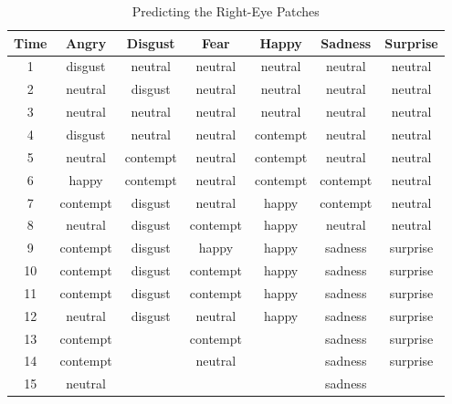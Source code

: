 \begin{table}
\caption{Predicting the Right-Eye Patches}
\label{table:predict_righteye}

\begin{tabular}{| c | c | c | c | c | c | c |}
\hline
Time & Angry &  Disgust  & Fear & Happy & Sadness & Surprise  \\
\hline
1 & disgust & neutral & neutral & neutral & neutral & neutral \\
2 & neutral & disgust & neutral & neutral & neutral & neutral \\
3 & neutral & neutral & neutral & neutral & neutral & neutral \\
4 & disgust & neutral & neutral & contempt & neutral & neutral \\
5 & neutral & contempt & neutral & contempt & neutral & neutral	\\
6 & happy & contempt & neutral & contempt & contempt & neutral \\
7 & contempt & disgust & neutral & happy & contempt & neutral \\
8 & neutral & disgust & contempt & happy & neutral & neutral \\
9 & contempt & disgust & happy & happy & sadness & surprise \\
10 & contempt & disgust & contempt & happy & sadness & surprise	\\
11 & contempt & disgust & contempt & happy & sadness & surprise \\
12 & neutral & disgust & neutral & happy & sadness & surprise \\
13 & contempt &  & contempt &  & sadness & surprise \\
14 & contempt &  & neutral &  & sadness & surprise \\
15 & neutral &  &  &  & sadness & \\

\hline
\end{tabular}
\end{table}
